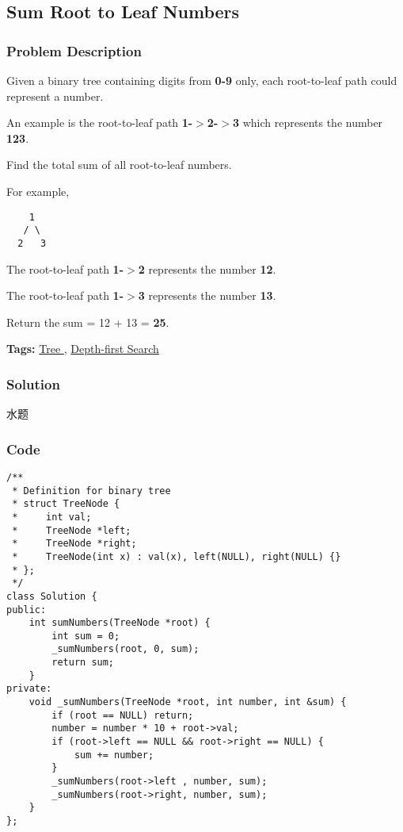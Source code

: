 \documentclass{article}
\begin{document}
\begin{CJK*}{UTF8}{gkai}
\subsection{ Sum Root to Leaf Numbers }
\label{ Sum Root to Leaf Numbers }

\subsubsection*{Problem Description}
Given a binary tree containing digits from \textbf{0-9} only, each root-to-leaf path could represent a number.

An example is the root-to-leaf path \textbf{1-$>$2-$>$3} which represents the number \textbf{123}.

Find the total sum of all root-to-leaf numbers.

For example,
\begin{verbatim}
    1
   / \
  2   3
\end{verbatim}

The root-to-leaf path \textbf{1-$>$2} represents the number \textbf{12}.


The root-to-leaf path \textbf{1-$>$3} represents the number \textbf{13}.

Return the sum = 12 + 13 = \textbf{25}.


\textbf{Tags: }
\hyperref[ Tree ]{ Tree },  \hyperref[ Depth-first Search ]{ Depth-first Search }



\subsubsection*{Solution}
水题

\subsubsection*{Code}
\begin{lstlisting}
/**
 * Definition for binary tree
 * struct TreeNode {
 *     int val;
 *     TreeNode *left;
 *     TreeNode *right;
 *     TreeNode(int x) : val(x), left(NULL), right(NULL) {}
 * };
 */
class Solution {
public:
    int sumNumbers(TreeNode *root) {
        int sum = 0;
        _sumNumbers(root, 0, sum);
        return sum;
    }
private:
    void _sumNumbers(TreeNode *root, int number, int &sum) {
        if (root == NULL) return;
        number = number * 10 + root->val;
        if (root->left == NULL && root->right == NULL) {
            sum += number;
        }
        _sumNumbers(root->left , number, sum);
        _sumNumbers(root->right, number, sum);
    }
}; 
\end{lstlisting}



\end{CJK*}
\end{document}

